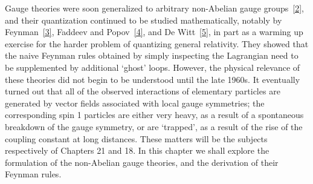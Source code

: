 Gauge theories were soon generalized to arbitrary non-Abelian gauge
groups~\hyperref[ch15-ref-2]{[2]}, and their quantization continued to be studied
mathematically, notably by Feynman~\hyperref[ch15-ref-3]{[3]}, Faddeev and
Popov~\hyperref[ch15-ref-4]{[4]}, and De Witt~\hyperref[ch15-ref-5]{[5]}, in part
as a warming up exercise for the harder problem of quantizing general relativity.
They showed that the naive Feynman rules obtained by simply inspecting the
Lagrangian need to be supplemented by additional `ghost' loops. However, the
physical relevance of these theories did not begin to be understood until the
late 1960s. It eventually turned out that all of the observed interactions of
elementary particles are generated by vector fields associated with local gauge
symmetries; the corresponding spin 1 particles are either very heavy, as a result
of a spontaneous breakdown of the gauge symmetry, or are `trapped', as a result
of the rise of the coupling constant at long distances. These matters will be the
subjects respectively of Chapters 21 and 18. In this chapter we shall explore the
formulation of the non-Abelian gauge theories, and the derivation of their Feynman
rules.
